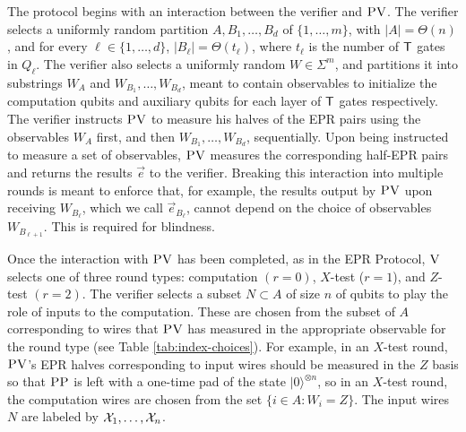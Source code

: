 \documentclass[11pt]{article}
\theoremstyle{remark}
\theoremstyle{definition}
\newcommand{\ket}[1]{|#1\rangle}
\newcommand{\ver}{\textsc{V}}
\newcommand{\pv}{\textsc{PV}}
\newcommand{\pp}{\textsc{PP}}
\begin{document}
The protocol begins with an interaction between the verifier and $\pv$. The verifier selects a uniformly random partition $A,B_1,\dots,B_d$ of $\{1,\dots,m\}$, with $|A|=\Theta(n)$, and for every $\ell\in\{1,\dots,d\}$, $|B_{\ell}|=\Theta(t_\ell)$, where $t_{\ell}$ is the number of $\sf T$ gates in $Q_\ell$. The verifier also selects a uniformly random $W\in\Sigma^m$, and partitions it into substrings $W_A$ and $W_{B_1},\ldots,W_{B_d}$, meant to contain observables to initialize the computation qubits and auxiliary qubits for each layer of ${\sf T}$ gates respectively. The verifier instructs $\pv$ to measure his halves of the EPR pairs using the observables $W_A$ first, and then $W_{B_1},\ldots,W_{B_d}$, sequentially. Upon being instructed to measure a set of observables, $\pv$ measures the corresponding half-EPR pairs and returns the results $\vec{e}$ to the verifier. Breaking this interaction into multiple rounds is meant to enforce that, for example, the results output by $\pv$ upon receiving $W_{B_{\ell}}$, which we call $\vec{e}_{B_{\ell}}$, cannot depend on the choice of observables $W_{B_{\ell+1}}$. This is required for blindness. 

Once the interaction with $\pv$ has been completed, as in the EPR Protocol, $\ver$ selects one of three round types: computation $(r=0)$, $X$-test ($r=1$), and $Z$-test $(r=2)$. 
The verifier selects a subset $N\subset A$ of size $n$ of qubits to play the role of inputs to the computation. These are chosen from the subset of $A$ corresponding to wires that $\pv$ has measured in the appropriate observable for the round type (see Table \ref{tab:index-choices}). For example, in an $X$-test round, $\pv$'s EPR halves corresponding to input wires should be measured in the $Z$ basis so that $\pp$ is left with a one-time pad of the state $\ket{0}^{\otimes n}$, so in an $X$-test round, the computation wires are chosen from the set $\{i\in A:W_i=Z\}$. The input wires $N$ are labeled by ${\cal X}_1,\dots,{\cal X}_n$. 
\end{document}
